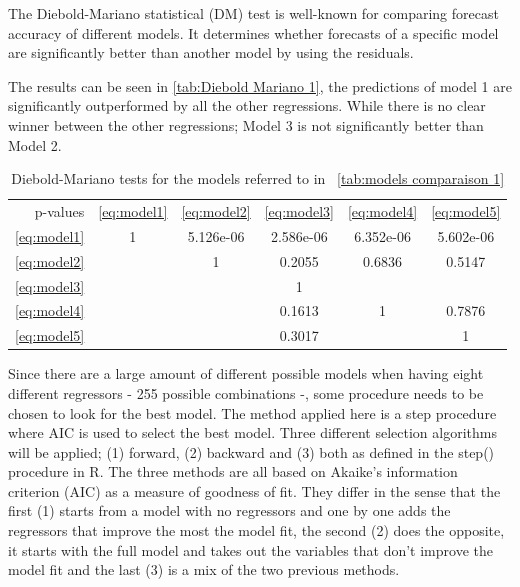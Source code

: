 \documentclass[12pt,a4paper,oneside]{book}
\begin{document}

The Diebold-Mariano statistical (DM) test \citep{diebold_comparing_1995} is well-known for comparing forecast accuracy of different models. 
It determines whether forecasts of a specific model are significantly better than another model by using the residuals.


The results can be seen in \autoref{tab:Diebold Mariano 1}, the predictions of model 1 are significantly outperformed by all the other regressions. While there is no clear winner between the other regressions; Model 3 is not significantly better than Model 2.


\begin{table}[htbp!]
    \caption{Diebold-Mariano tests for the models referred to in \ \autoref{tab:models comparaison 1} }
    \label{tab:Diebold Mariano 1}
     \centering \footnotesize
    \begin{tabular}{| r | c c c c c |}
    \cline{2-6}
 \multicolumn{0}{r|}{p-values}	& \ref{eq:model1} & \ref{eq:model2} & \ref{eq:model3} & \ref{eq:model4} & \ref{eq:model5} \\ \cline{1-6}
 \ref{eq:model1} & 1 & 5.126e-06 & 2.586e-06 & 6.352e-06 & 5.602e-06\\ 
 \ref{eq:model2} &   & 1  & 0.2055 & 0.6836 & 0.5147 \\
 \ref{eq:model3} &   &   & 1 & &   \\
 \ref{eq:model4} &   &   &  0.1613 & 1 & 0.7876 \\
 \ref{eq:model5} &   &   & 0.3017 &   & 1 \\ \cline{1-6}
\end{tabular}
\end{table}




Since there are a large amount of different possible models when having eight different regressors - 255 possible combinations -, some procedure needs to be chosen to look for the best model.
The method applied here is a step procedure where AIC is used to select the best model.
Three different selection algorithms will be applied; (1) forward, (2) backward and (3) both as defined in the step() procedure in R. 
The three methods are all based on Akaike's information criterion (AIC) as a measure of goodness of fit. They differ in the sense that the first (1) starts from a model with no regressors and one by one adds the regressors that improve the most the model fit, the second (2) does the opposite, it starts with the full model and takes out the variables that don't improve the model fit and the last (3) is a mix of the two previous methods.
\end{document}

